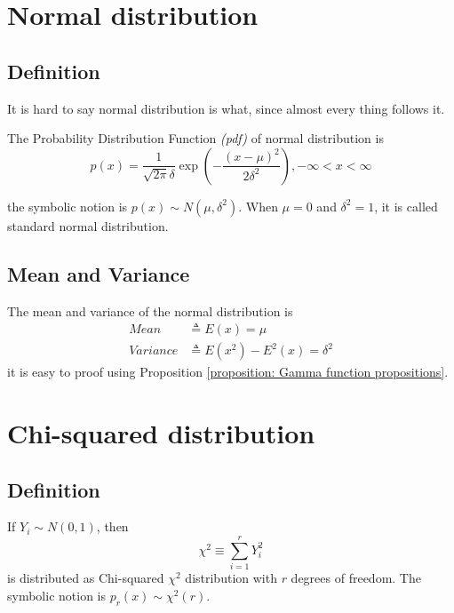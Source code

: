 \documentclass[a4paper]{article}
\begin{document}
\section{Normal distribution}

\subsection{Definition}

It is hard to say normal distribution is what, since almost every thing follows it.

The Probability Distribution Function \emph{(pdf)} of normal distribution is
\begin{equation}
    p(x) = \frac{1}{\sqrt{2\pi}\delta} \exp({-\frac{(x-\mu)^2}{2\delta^2}}), -\infty < x < \infty
\end{equation}

the symbolic notion is $p(x) \sim N(\mu, \delta^2)$.
When $\mu = 0$ and $\delta^2 = 1$, it is called standard normal distribution.

\subsection{Mean and Variance}

The mean and variance of the normal distribution is
\begin{equation*}
    \begin{aligned}
        Mean     & \triangleq E(x) = \mu                 \\
        Variance & \triangleq E(x^2) - E^2(x) = \delta^2
    \end{aligned}
\end{equation*}
it is easy to proof using Proposition \ref{proposition: Gamma function propositions}.

\newpage

\section{Chi-squared distribution}

\subsection{Definition}

If $Y_i \sim N(0, 1)$, then
\begin{equation}
    \chi^2 \equiv \sum_{i = 1}^{r} Y_i^2
\end{equation}
is distributed as Chi-squared \emph{$\chi^2$} distribution with $r$ degrees of freedom.
The symbolic notion is $p_r(x) \sim \chi^2(r)$.
\end{document}
